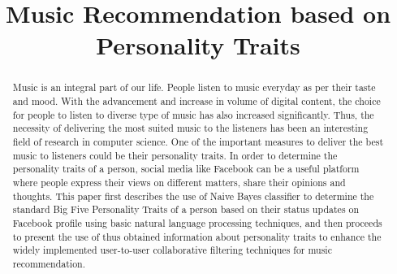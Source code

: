 \documentclass[conference]{IEEEtran}
\begin{document}
\title{Music Recommendation based on Personality Traits}

\author{
\and
{}
\and
{}
\and
{}

}

\maketitle

\begin{abstract}
Music is an integral part of our life. People listen to music everyday as per their taste and mood. With the advancement and increase in volume of digital content, the choice for people to listen to diverse type of music has also increased significantly. Thus, the necessity of delivering the most suited music to the listeners has been an interesting field of research in computer science. One of the important measures to deliver the best music to listeners could be their personality traits. In order to determine the personality traits of a person, social media like Facebook can be a useful platform where people express their views on different matters, share their opinions and thoughts. This paper first describes the use of Naive Bayes classifier to determine the standard Big Five Personality Traits of a person based on their status updates on Facebook profile using basic natural language processing techniques, and then proceeds to present the use of thus obtained information about personality traits to enhance the widely implemented user-to-user collaborative filtering techniques for music recommendation.
\end{abstract}
\end{document}
